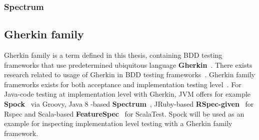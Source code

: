     \subsubsection{Spectrum}

    \subsection{Gherkin family}
    Gherkin family is a term defined in this thesis, containing BDD testing frameworks that use predetermined ubiquitous
    language \textbf{Gherkin}~\cite{gherkin}. There exists research related to usage of Gherkin in BDD testing frameworks~\cite{okolnychyi2016study}.
    Gherkin family frameworks exists for both acceptance and implementation testing level~\cite{okolnychyi2016study}. For Java-code testing at
    implementation level with Gherkin, JVM offers for example \textbf{Spock}~\cite{spock} via Groovy, Java 8 -based \textbf{Spectrum}~\cite{spectrum},
    JRuby-based \textbf{RSpec-given}~\cite{rspec-given} for Rspec and Scala-based \textbf{FeatureSpec}~\cite{featurespec} for ScalaTest.
    Spock will be used as an example for inspecting implementation level testing with a Gherkin family framework.
